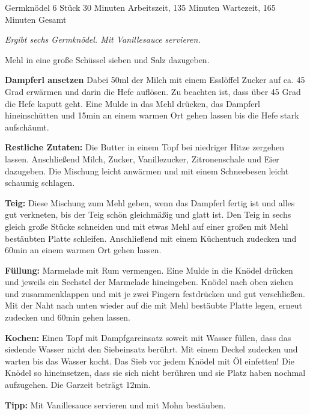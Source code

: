 \begin{recipe}{Germknödel} {6 Stück} {30 Minuten Arbeitszeit, 135 Minuten Wartezeit, 165 Minuten Gesamt}

  \freeform{}\textit{Ergibt sechs Germknödel. Mit Vanillesauce servieren.}


  Mehl in eine große Schüssel sieben und Salz dazugeben.

  \newstep{}\textbf{Dampferl ansetzen}
  Dabei 50ml der Milch mit einem Esslöffel Zucker auf ca. 45 Grad erwärmen und darin die Hefe auflösen.
  Zu beachten ist, dass über 45 Grad die Hefe kaputt geht.
  Eine Mulde in das Mehl drücken, das Dampferl hineinschütten und 15min an einem warmen Ort gehen lassen bis die Hefe stark aufschäumt.

  \newstep{}\textbf{Restliche Zutaten:}
  Die Butter in einem Topf bei niedriger Hitze zergehen lassen.
  Anschließend Milch, Zucker, Vanillezucker, Zitronenschale und Eier dazugeben.
  Die Mischung leicht anwärmen und mit einem Schneebesen leicht schaumig schlagen.

  \newstep{}\textbf{Teig:}
  Diese Mischung zum Mehl geben, wenn das Dampferl fertig ist und alles gut verkneten, bis der Teig schön gleichmäßig und glatt ist.
  Den Teig in sechs gleich große Stücke schneiden und mit etwas Mehl auf einer großen mit Mehl bestäubten Platte schleifen.
  Anschließend mit einem Küchentuch zudecken und 60min an einem warmen Ort gehen lassen.

  \newstep{}\textbf{Füllung:}
  Marmelade mit Rum vermengen.
  Eine Mulde in die Knödel drücken und jeweils ein Sechstel der Marmelade hineingeben.
  Knödel nach oben ziehen und zusammenklappen und mit je zwei Fingern festdrücken und gut verschließen.
  Mit der Naht nach unten wieder auf die mit Mehl bestäubte Platte legen, erneut zudecken und 60min gehen lassen.

  \newstep{}\textbf{Kochen:}
  Einen Topf mit Dampfgareinsatz soweit mit Wasser füllen, dass das siedende Wasser nicht den Siebeinsatz berührt.
  Mit einem Deckel zudecken und warten bis das Wasser kocht.
  Das Sieb vor jedem Knödel mit Öl einfetten!
  Die Knödel so hineinsetzen, dass sie sich nicht berühren und sie Platz haben nochmal aufzugehen.
  Die Garzeit beträgt 12min.

  \freeform{}\hrulefill{}

  \freeform{}\textbf{Tipp:}
  Mit Vanillesauce servieren und mit Mohn bestäuben.

  \end{recipe}
